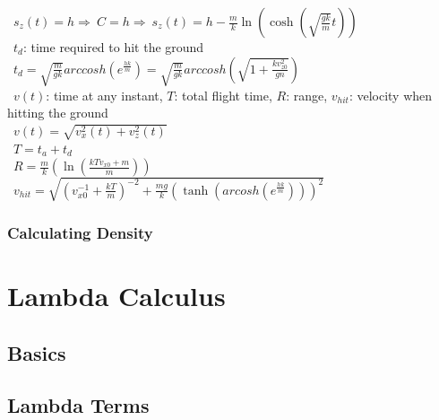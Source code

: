 \documentclass[10pt,letterpaper]{scrartcl}
\newcommand{\tbul}{\textbullet}
\newcommand{\tend}{\>\textendash}
\begin{document}
\begin{tabbing}
    \>\>\ $\displaystyle s_z(t) = h\Rightarrow\ C = h\Rightarrow\ s_z(t) = h-\frac{m}{k}\ln(\cosh(\sqrt{\frac{gk}{m}}t))$ \\
    \tend\ $t_d$: time required to hit the ground \\
    \>\>\ $\displaystyle t_d = \sqrt{\frac{m}{gk}}arccosh(e^{\frac{hk}{m}}) = \sqrt{\frac{m}{gk}}arccosh(\sqrt{1 + \frac{kv^2_{z0}}{gn}})$ \\
\tbul\ $v(t)$: time at any instant, $T$: total flight time, $R$: range, $v_{hit}$: velocity when hitting the ground \\
    \>\>\ $\displaystyle v(t) = \sqrt{v^2_x(t) + v^2_z(t)}$ \\
    \>\>\ $\displaystyle T = t_a + t_d$ \\
    \>\>\ $\displaystyle R = \frac{m}{k}(\ln(\frac{kTv_{x0}+m}{m}))$ \\
    \>\>\ $\displaystyle v_{hit} = \sqrt{(v^{-1}_{x0} + \frac{kT}{m})^{-2} + \frac{mg}{k}(\tanh(arcosh(e^{\frac{hk}{m}})))^2}$ \\
\end{tabbing}
\subsubsection*{Calculating Density}

\newpage\section{Lambda Calculus}
\subsection*{Basics}

\subsection*{Lambda Terms}
\end{document}
